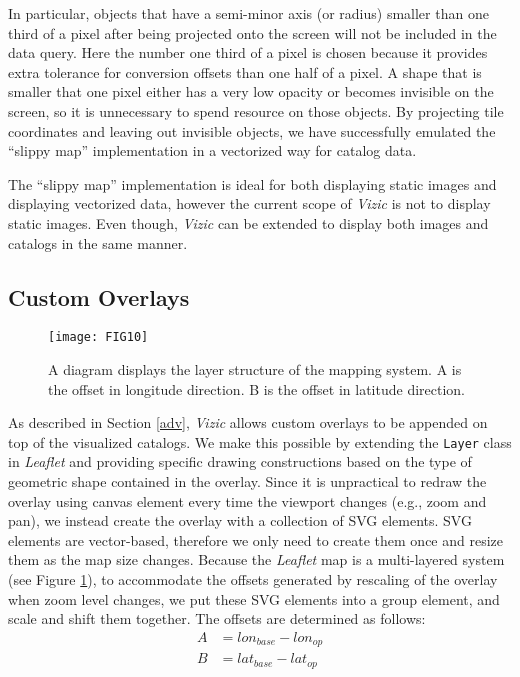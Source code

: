 \documentclass[../vis.tex]{subfiles}
\begin{document}
In particular, objects that have a semi-minor axis (or radius) smaller than one third of a pixel after being projected onto the screen will not be included in the data query. Here the number one third of a pixel is chosen because it provides extra tolerance for conversion offsets than one half of a pixel.
A shape that is smaller that one pixel either has a very low opacity or becomes invisible on the screen, so it is unnecessary to spend resource on those objects.
By projecting tile coordinates and leaving out invisible objects, we have successfully emulated the ``slippy map'' implementation in a vectorized way for catalog data.

The ``slippy map'' implementation is ideal for both displaying static images and displaying vectorized data, however the current scope of \textit{Vizic} is not to display static images. Even though, \textit{Vizic} can be extended to display both images and catalogs in the same manner.
\subsection{Custom Overlays}
\label{overlay_mech}
\begin{figure}[h]
  \centering
  \texttt{[image: FIG10]}
  \captionsetup{width=0.45\textwidth}
  \caption{A diagram displays the layer structure of the mapping system. A is the offset in longitude direction. B is the offset in latitude direction.}
  \label{fig:layerdiagram}
\end{figure}
As described in Section \ref{adv}, \textit{Vizic} allows custom overlays to be appended on top of the visualized catalogs.
We make this possible by extending the \texttt{Layer} class in \textit{Leaflet} and providing specific drawing constructions based on the type of geometric shape contained in the overlay.
Since it is unpractical to redraw the overlay using canvas element every time the viewport changes (e.g., zoom and pan), we instead create the overlay with a collection of SVG elements.
SVG elements are vector-based, therefore we only need to create them once and resize them as the map size changes.
Because the \textit{Leaflet} map is a multi-layered system (see Figure \ref{fig:layerdiagram}), to accommodate the offsets generated by rescaling of the overlay when zoom level changes, we put these SVG elements into a group element, and scale and shift them together.
The offsets are determined as follows:
\begin{align*}
A &= lon_{base} - lon_{op}\\
B &= lat_{base} - lat_{op}
\end{align*}
\end{document}
